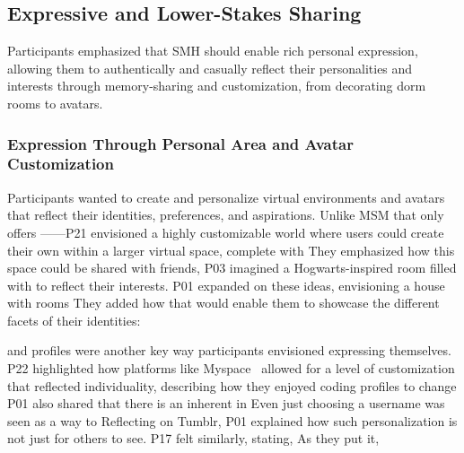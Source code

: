 \subsection{Expressive and Lower-Stakes Sharing}
\label{lab:4-3}
Participants emphasized that SMH should enable rich personal expression, allowing them to authentically and casually reflect their personalities and interests through memory-sharing and customization, from decorating dorm rooms to avatars.

\subsubsection{Expression Through Personal Area and Avatar Customization}
\label{lab:4-3-1}
Participants wanted to create and personalize virtual environments and avatars that reflect their identities, preferences, and aspirations. Unlike MSM that only offers ------P21 envisioned a highly customizable world where users could create their own  within a larger virtual space, complete with  They emphasized how this space could be shared with friends,  P03 imagined a  Hogwarts-inspired room filled with  to reflect their interests. P01 expanded on these ideas, envisioning a house with rooms  They added how that would enable them to showcase the different facets of their identities:  

 and profiles were another key way participants envisioned expressing themselves. P22 highlighted how platforms like Myspace~\cite{myspace} allowed for a level of customization that reflected individuality, describing how they enjoyed coding profiles to change  P01 also shared that there is an inherent  in  Even just choosing a username was seen as a way to  Reflecting on Tumblr, P01 explained how such personalization is  not just for others to see. P17 felt similarly, stating,  As they put it, 

